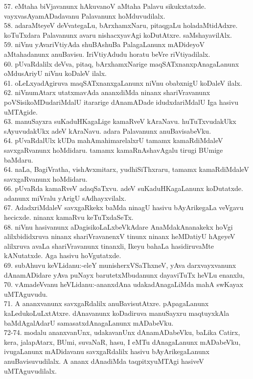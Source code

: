 \documentclass{article}
\begin{document}
57. eMtaha biVjavanunx hAkuvanoV aMtaha Palavu sikukxtatxde. vayxvasAyamADadavanu Palavanunx hoMduvudilalx.\\
58. adaraMteyeV deVvategaLu, bArxhamxNaru, pitaqgaLu holadaMtidAdxre. koTuTxdara Palavanunx avaru nishacxyavAgi koDutAtxre. saMshayavilAlx.\\
59. niVnu yAvariVtiyAda shuBAshuBa PalagaLanunx mADideyoV aMtahadanunx anuBavisu. IriVtiyAdudu horatu beVre riVtiyadilalx.\\
60. pUvaRdalilx deVva, pitaq, bArxhamxNarige maqSATxnanxpAnagaLanunx oMdusAriyU niVnu koDaleV ilalx.\\
61. oLeLxyadAgiruva maqSATxnanxgaLanunx niVnu obabxnigU koDaleV ilalx.\\
62. niVnumAtarx utatxmavAda ananxdiMda ninanx shariVravanunx poVSisikoMDudariMdalU itararige dAnamADade idudxdariMdalU Iga hasivu uMTAgide.\\
63. manuSayxra suKaduHKagaLige kamaRveV kAraNavu. huTuTxvudakUkx sAyuvudakUkx adeV kAraNavu. adara Palavanunx anuBavisabeVku.\\
64. pUvaRdalUlx kUDa mahAmahimarelalxrU tamamx kamaRdiMdaleV savxgaRvanunx hoMdidaru. tamamx kamaRnAshavAgalu tirugi BUmige baMdaru.\\
64. naLa, BagiVratha, vishAvxmitarx, yudhiSiThxraru, tamamx kamaRdiMdaleV savxgaRvanunx hoMdidaru.\\
66. pUvaRda kamaRveV adaqSaTxvu. adeV suKaduHKagaLanunx koDutatxde. adanunx miVralu yArigU sAdhayxvilalx.\\
67. AdadxriMdaleV savxgaRkekx baMda ninagU hasivu bAyArikegaLa veVgavu hecicxde. ninanx kamaRvu keTuTxdaSeTx.\\
68. niVnu hasivanunx aDagisikoLaLxbeVkAdare AnaMdakAnanakekx hoVgi alilxbididxruva ninanx shariVravanenxV tinunx ninanx heMDatiyU hAgeyeV alilxruva avaLa shariVravanunx tinanxli, Ikeyu bahaLa hasidiruvaMte kANutatxde. Aga hasivu hoVgutatxde.\\
69. subAhuvu keVLidanu:-eleY munisherxVSaThxneV, yAva darxvayxvanunx dAnamADidare yAva puNayx barutetxMbudanunx dayaviTuTx heVLu enanxlu,\\
70. vAmadeVvanu heVLidanu:-ananxdAna udakadAnagaLiMda mahA swKayax uMTAguvudu.\\
71. A ananxvanunx savxgaRdalilx anuBavisutAtxre. pApagaLanunx kaLedukoLuLxtAtxre. dAnavanunx koDadiruva manuSayxru maqtuyxkAla baMdAgalAdarU samasatxdAnagaLanunx mADabeVku.\\
72-74. modalu ananxvanUnx, udakavanUnx dAnamADabeVku, baLika Catirx, kera, jalapAtarx, BUmi, suvaNaR, hasu, I eMTu dAnagaLanunx mADabeVku, ivugaLanunx mADidavanu savxgaRdalilx hasivu bAyArikegaLanunx anuBavisuvudilalx. A ananx dAnadiMda taqpitxyuMTAgi hasiveV uMTAguvudilalx.\\
\end{document}
